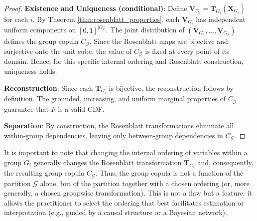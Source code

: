 \begin{proof}
\textbf{Existence and Uniqueness (conditional)}: Define $\mathbf{V}_{G_i} = \mathbf{T}_{G_i}(\mathbf{X}_{G_i})$ for each $i$. By Theorem \ref{thm:rosenblatt_properties}, each $\mathbf{V}_{G_i}$ has independent uniform components on $[0,1]^{|G_i|}$. The joint distribution of $(\mathbf{V}_{G_1}, \ldots, \mathbf{V}_{G_k})$ defines the group copula $C_{\mathcal{G}}$. Since the Rosenblatt maps are bijective and surjective onto the unit cube, the value of $C_{\mathcal{G}}$ is fixed at every point of its domain. Hence, for this specific internal ordering and Rosenblatt construction, uniqueness holds.

\textbf{Reconstruction}: Since each $\mathbf{T}_{G_i}$ is bijective, the reconstruction follows by definition. The grounded, increasing, and uniform marginal properties of $C_{\mathcal{G}}$ guarantee that $F$ is a valid CDF.

\textbf{Separation}: By construction, the Rosenblatt transformations eliminate all within-group dependencies, leaving only between-group dependencies in $C_{\mathcal{G}}$.
\end{proof}

\begin{remark}
It is important to note that changing the internal ordering of variables within a group $G_i$ generally changes the Rosenblatt transformation $\mathbf{T}_{G_i}$ and, consequently, the resulting group copula $C_{\mathcal{G}}$. Thus, the group copula is not a function of the partition $\mathcal{G}$ alone, but of the partition together with a chosen ordering (or, more generally, a chosen groupwise transformation). This is not a flaw but a feature: it allows the practitioner to select the ordering that best facilitates estimation or interpretation (e.g., guided by a causal structure or a Bayesian network).
\end{remark}

